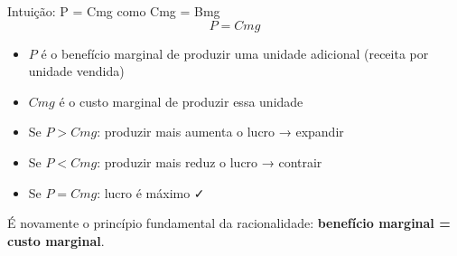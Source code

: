 \documentclass[
  ignorenonframetext,
  handout]{beamer}
\providecommand{\tightlist}{%
  \setlength{\itemsep}{0pt}\setlength{\parskip}{0pt}}
\begin{document}
\begin{frame}{Intuição: P = Cmg como Cmg = Bmg}
\label{intuiuxe7uxe3o-p-cmg-como-cmg-bmg}
\[P = Cmg\]

\begin{itemize}
\tightlist
\item
  \(P\) é o benefício marginal de produzir uma unidade adicional
  (receita por unidade vendida)
\item
  \(Cmg\) é o custo marginal de produzir essa unidade
\end{itemize}

\begin{itemize}
\tightlist
\item
  Se \(P > Cmg\): produzir mais aumenta o lucro → expandir
\item
  Se \(P < Cmg\): produzir mais reduz o lucro → contrair
\item
  Se \(P = Cmg\): lucro é máximo ✓
\end{itemize}

\begin{tcolorbox}[enhanced jigsaw, colback=white, colframe=quarto-callout-tip-color-frame, arc=.35mm, leftrule=.75mm, rightrule=.15mm, opacityback=0, breakable, toprule=.15mm, bottomrule=.15mm, left=2mm]

É novamente o princípio fundamental da racionalidade: \textbf{benefício
marginal = custo marginal}.

\end{tcolorbox}
\end{frame}
\end{document}

